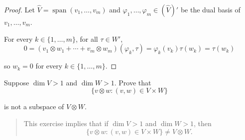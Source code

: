 \begin{proof}
    Let $\widehat{V} = \operatorname{span}(v_{1}, \ldots, v_{m})$ and $\varphi_{1}, \ldots, \varphi_{m}\in (\widehat{V})'$ be the dual basis of $v_{1}, \ldots, v_{m}$.

    For every $k\in\{1,\ldots,m\}$, for all $\tau\in W'$,
    \[
        0 = (v_{1}\otimes w_{1} + \cdots + v_{m}\otimes w_{m})(\varphi_{k}, \tau) = \varphi_{k}(v_{k})\tau(w_{k}) = \tau(w_{k})
    \]

    so $w_{k} = 0$ for every $k\in\{1,\ldots,m\}$.
\end{proof}
\newpage

\begin{exercise}\label{chapter9:sectionD:exercise4}
    Suppose $\dim V > 1$ and $\dim W > 1$. Prove that
    \[
        \{ v\otimes w: (v, w)\in V\times W \}
    \]

    is not a subspace of $V\otimes W$.
\end{exercise}

\begin{quote}
    This exercise implies that if $\dim V > 1$ and $\dim W > 1$, then
    \[
        \{ v\otimes w: (v, w)\in V\times W \} \ne V\otimes W.
    \]
\end{quote}

